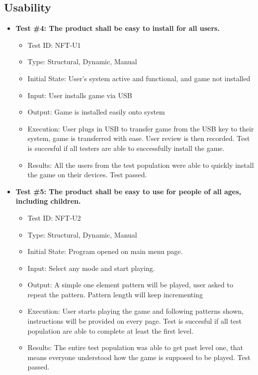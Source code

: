 \documentclass[12pt, titlepage]{article}
\begin{document}
\subsection{Usability}
\begin{itemize}
\item \textbf{Test \#4: The product shall be easy to install for all users.}
\begin{itemize}
\item Test ID: NFT-U1
\item Type: Structural, Dynamic, Manual			
\item Initial State: User's system active and functional, and game not installed 		
\item Input: User installs game via USB			
\item Output: Game is installed easily onto system				
\item Execution: User plugs in USB to transfer game from the USB key to their system, game is transferred with ease. User review is then recorded. Test is succesful if all testers are able to successfully install the game.
\item Results: All the users from the test population were able to quickly install the game on their devices. Test passed.
\end{itemize}

\item \textbf{Test \#5: The product shall be easy to use for people of all ages, including children.}
\begin{itemize}
\item Test ID: NFT-U2
\item Type: Structural, Dynamic, Manual				
\item Initial State: Program opened on main menu page.		
\item Input: Select any mode and start playing.
\item Output: A simple one element pattern will be played, user asked to repeat the pattern. Pattern length will keep incrementing
\item Execution: User starts playing the game and following patterns shown, instructions will be provided on every page. Test is succesful if all test population are able to complete at least the first level.
\item Results: The entire test population was able to get past level one, that means everyone understood how the game is supposed to be played. Test passed.
\end{itemize}


\end{itemize}
\end{document}
